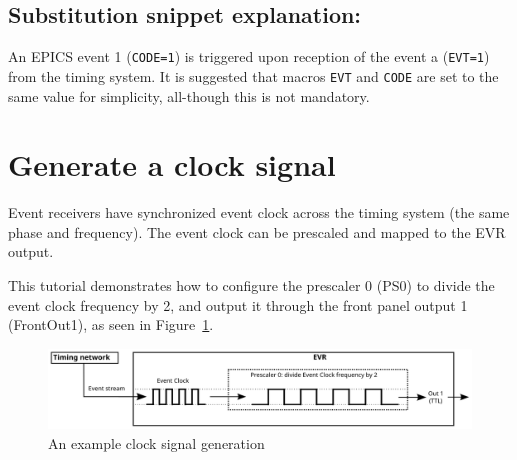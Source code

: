 \documentclass[12pt,a4paper]{article}
\begin{document}
\subsection{Substitution snippet explanation:}\label{sec:explain_event}
An EPICS event 1 (\texttt{CODE=1}) is triggered upon reception of the event a (\texttt{EVT=1}) from the timing system.
It is suggested that macros \texttt{EVT} and \texttt{CODE} are set to the same value for simplicity, all-though this is not mandatory.


\section{Generate a clock signal}

Event receivers have synchronized event clock across the timing system (the same phase and frequency). The event clock can be prescaled and mapped to the EVR output. 

This tutorial demonstrates how to configure the prescaler 0 (PS0) to divide the event clock frequency by 2, and output it through the front panel output 1 (FrontOut1), as seen in Figure~\ref{fig:prescaler}. 

\begin{figure}[H]
	\centering
	\includegraphics[width=\columnwidth]{./img/prescaler}
	\caption{An example clock signal generation}
	\label{fig:prescaler}
\end{figure}
\end{document}
